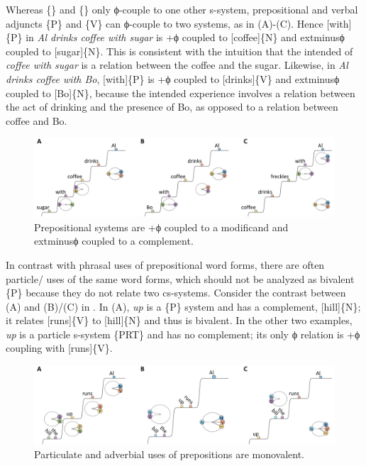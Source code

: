   Whereas \{\} and \{\} only ϕ-couple to one other s-system, prepositional and verbal adjuncts \{P\} and \{V\} can ϕ-couple to two systems, as in {}(A)-(C). Hence [with]\{P\} in \textit{Al drinks coffee with sugar} is +ϕ coupled to [coffee]\{N\} and 	extminus{}ϕ coupled to [sugar]\{N\}. This is consistent with the intuition that the intended  of \textit{coffee with sugar} is a relation between the coffee and the sugar. Likewise, in \textit{Al drinks coffee with Bo}, [with]\{P\} is +ϕ coupled to [drinks]\{V\} and 	extminus{}ϕ coupled to [Bo]\{N\}, because the intended experience involves a relation between the act of drinking and the presence of Bo, as opposed to a relation between coffee and Bo.

  
\begin{figure}
\includegraphics[width=\textwidth]{figures/Tilsen-img84.png}
\caption{Prepositional systems are +ϕ coupled to a modificand and 	extminus{}ϕ coupled to a complement.}
\label{fig:4:34}
\end{figure}
 

  In contrast with phrasal uses of prepositional word forms, there are often particle/ uses of the same word forms, which should not be analyzed as bivalent \{P\} because they do not relate two cs-systems. Consider the contrast between (A) and (B)/(C) in {}. In (A), \textit{up} is a \{P\} system and has a complement, [hill]\{N\}; it relates [runs]\{V\} to [hill]\{N\} and thus is bivalent. In the other two examples, \textit{up} is a particle s-system \{PRT\} and has no complement; its only ϕ relation is +ϕ coupling with [runs]\{V\}.

  
\begin{figure}
\includegraphics[width=\textwidth]{figures/Tilsen-img85.png}
\caption{Particulate and adverbial uses of prepositions are monovalent.}
\label{fig:4:35}
\end{figure}
 


